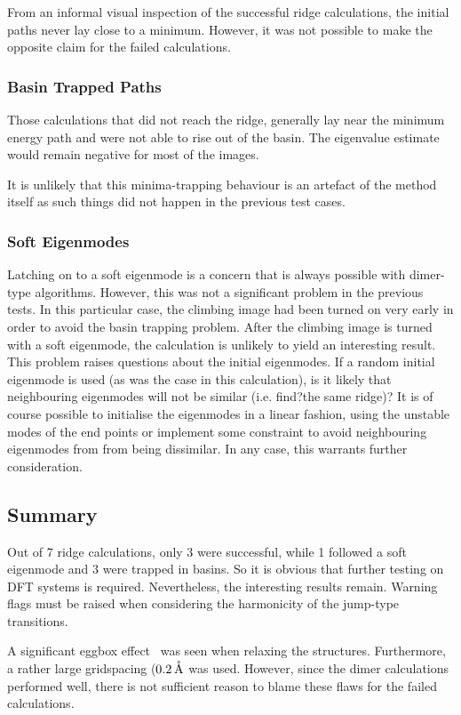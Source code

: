 From an informal visual inspection of the successful ridge calculations, the initial paths never lay close to a minimum.
However, it was not possible to make the opposite claim for the failed calculations.

\subsubsection{Basin Trapped Paths}
Those calculations that did not reach the ridge, generally lay near the minimum energy path and were not able to rise out of the basin.
The eigenvalue estimate would remain negative for most of the images.

It is unlikely that this minima-trapping behaviour is an artefact of the method itself as such things did not happen in the previous test cases.

\subsubsection{Soft Eigenmodes}
Latching on to a soft eigenmode is a concern that is always possible with dimer-type algorithms.
However, this was not a significant problem in the previous tests.
In this particular case, the climbing image had been turned on very early in order to avoid the basin trapping problem.
After the climbing image is turned with a soft eigenmode, the calculation is unlikely to yield an interesting result.
This problem raises questions about the initial eigenmodes.
If a random initial eigenmode is used (as was the case in this calculation), is it likely that neighbouring eigenmodes will not be similar (i.e. find?the same ridge)?
It is of course possible to initialise the eigenmodes in a linear fashion, using the unstable modes of the end points or implement some constraint to avoid neighbouring eigenmodes from from being dissimilar.
In any case, this warrants further consideration.

\subsection{Summary}
Out of 7 ridge calculations, only 3 were successful, while 1 followed a soft eigenmode and 3 were trapped in basins.
So it is obvious that further testing on DFT systems is required.
Nevertheless, the interesting results remain.
Warning flags must be raised when considering the harmonicity of the jump-type transitions.

A significant eggbox effect~\cite{gpaw-2005} was seen when relaxing the structures.
Furthermore, a rather large gridspacing ($0.2 \, \mathrm{\mathring{\mathrm{A}}}$ was used.
However, since the dimer calculations performed well, there is not sufficient reason to blame these flaws for the failed calculations.

